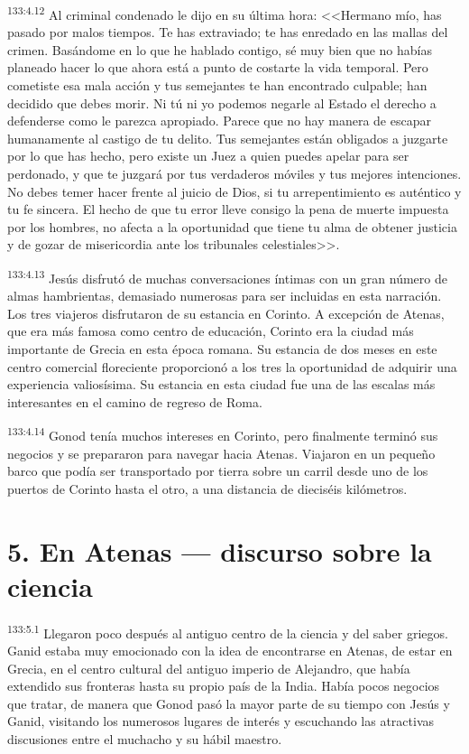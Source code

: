 \par 
\textsuperscript{133:4.12} Al criminal condenado le dijo en su última hora: <<Hermano mío, has pasado por malos tiempos. Te has extraviado; te has enredado en las mallas del crimen. Basándome en lo que he hablado contigo, sé muy bien que no habías planeado hacer lo que ahora está a punto de costarte la vida temporal. Pero cometiste esa mala acción y tus semejantes te han encontrado culpable; han decidido que debes morir. Ni tú ni yo podemos negarle al Estado el derecho a defenderse como le parezca apropiado. Parece que no hay manera de escapar humanamente al castigo de tu delito. Tus semejantes están obligados a juzgarte por lo que has hecho, pero existe un Juez a quien puedes apelar para ser perdonado, y que te juzgará por tus verdaderos móviles y tus mejores intenciones. No debes temer hacer frente al juicio de Dios, si tu arrepentimiento es auténtico y tu fe sincera. El hecho de que tu error lleve consigo la pena de muerte impuesta por los hombres, no afecta a la oportunidad que tiene tu alma de obtener justicia y de gozar de misericordia ante los tribunales celestiales>>.

\par 
\textsuperscript{133:4.13} Jesús disfrutó de muchas conversaciones íntimas con un gran número de almas hambrientas, demasiado numerosas para ser incluidas en esta narración. Los tres viajeros disfrutaron de su estancia en Corinto. A excepción de Atenas, que era más famosa como centro de educación, Corinto era la ciudad más importante de Grecia en esta época romana. Su estancia de dos meses en este centro comercial floreciente proporcionó a los tres la oportunidad de adquirir una experiencia valiosísima. Su estancia en esta ciudad fue una de las escalas más interesantes en el camino de regreso de Roma.

\par 
\textsuperscript{133:4.14} Gonod tenía muchos intereses en Corinto, pero finalmente terminó sus negocios y se prepararon para navegar hacia Atenas. Viajaron en un pequeño barco que podía ser transportado por tierra sobre un carril desde uno de los puertos de Corinto hasta el otro, a una distancia de dieciséis kilómetros.

\section*{5. En Atenas --- discurso sobre la ciencia}
\par 
\textsuperscript{133:5.1} Llegaron poco después al antiguo centro de la ciencia y del saber griegos. Ganid estaba muy emocionado con la idea de encontrarse en Atenas, de estar en Grecia, en el centro cultural del antiguo imperio de Alejandro, que había extendido sus fronteras hasta su propio país de la India. Había pocos negocios que tratar, de manera que Gonod pasó la mayor parte de su tiempo con Jesús y Ganid, visitando los numerosos lugares de interés y escuchando las atractivas discusiones entre el muchacho y su hábil maestro.

